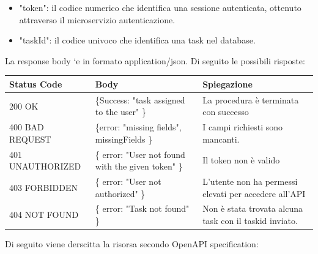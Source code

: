 \documentclass{report}
\begin{document}
\begin{itemize}
	\item "token": il codice numerico che identifica una sessione autenticata, ottenuto attraverso il microservizio autenticazione.
	\item "taskId": il codice univoco che identifica una task nel database.
\end{itemize}

La response body `e in formato application/json. Di seguito le possibili risposte:

\begin{center} %
	\centering
	\begin{tabular}{ |p{4cm}|p{4cm}|p{4cm}| }
		\hline
		\centering Status Code & \qquad\qquad\quad Body & \qquad\quad Spiegazione\\ %
		\hline
		200 OK & \{Success: "task assigned to the user" \}  & La procedura è terminata con successo	\\ 
		\hline
		400 BAD REQUEST & \{error: "missing fields", missingFields \} & I campi richiesti sono mancanti. \\
		\hline
		401 UNAUTHORIZED & \{ error: "User not found with the given token" \} & Il token non è valido \\
		\hline
		403 FORBIDDEN & \{ error: "User not authorized" \} &  L'utente non ha permessi elevati per accedere all'API \\
		\hline
		404 NOT FOUND & \{ error: "Task not found" \} & Non è stata trovata alcuna task con il taskid inviato. \\
		\hline
	\end{tabular}
\end{center}

Di seguito viene derscitta la risorsa secondo OpenAPI specification:
\end{document}
